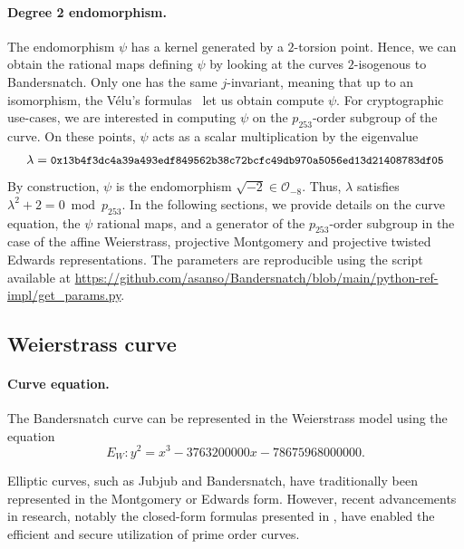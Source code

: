 \documentclass[smallextended]{svjour3}
\begin{document}
\paragraph{Degree 2 endomorphism.}
The endomorphism $\psi$ has a kernel generated by a $2$-torsion
point. Hence, we can obtain the rational maps defining $\psi$ by
looking at the curves $2$-isogenous to Bandersnatch. Only one has the
same $j$-invariant, meaning that up to an isomorphism, the Vélu's
formulas~\cite{velu71} let us obtain compute $\psi$.
For cryptographic use-cases, we are interested in computing $\psi$ on
the $p_{253}$-order subgroup of the curve. On these points, $\psi$
acts as a scalar multiplication by the eigenvalue
$$\lambda = \text{{\small{\tt
0x13b4f3dc4a39a493edf849562b38c72bcfc49db970a5056ed13d21408783df05}}}$$
By construction, $\psi$ is the endomorphism $\sqrt{-2}\in \mathcal
O_{-8}$. Thus, $\lambda$ satisfies
$\lambda^2+2 = 0 \bmod p_{253}$.
In the following sections, we provide details on the curve equation,
the $\psi$ rational maps, and a generator of the $p_{253}$-order
subgroup in the case of the affine Weierstrass, projective Montgomery
and projective twisted Edwards representations.
The parameters are reproducible using the script available at  \url{https://github.com/asanso/Bandersnatch/blob/main/python-ref-impl/get\_params.py}.

\subsection{Weierstrass curve}\label{sec-w-curve}
\paragraph{Curve equation.}
The Bandersnatch curve can be represented in the Weierstrass model
using the equation
$$E_W:y^2 = x^3 -3763200000x -78675968000000.$$

Elliptic curves, such as Jubjub and Bandersnatch, have traditionally been represented in the Montgomery or Edwards form. However, recent advancements in research, notably the closed-form formulas presented in \cite{EC:RenCosBat16}, have enabled the efficient and secure utilization of prime order curves. 
\end{document}
